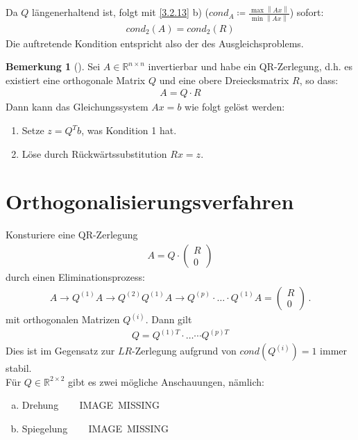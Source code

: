 \documentclass[ngerman,fontsize=11pt, paper=a4, parskip=half, titlepage=true, toc=bib]{scrbook}
\theoremstyle{definition}
\newtheorem{Bem}[Def]{Bemerkung}	%
\theoremstyle{plain}
\newcommand{\R}{\mathds{R}}
\newcommand{\Renn}{\mathds{R}^{n\times n}}
\newcommand{\nn}[1]{\left\| #1 \right\|}
\newcommand{\sectione}[1]{\section{#1} \setcounter{equation}{0}}
\newcommand{\subsectione}[1]{\subsection{#1} \addtocounter{Def}{1}}
\newenvironment{Beme}[1][]{ %
	\begin{Bem}[#1]
	}
	{
	\end{Bem}
	\addtocounter{subsection}{1}
}
\begin{document}
  Da $Q$ längenerhaltend ist, folgt mit \ref{3.2.13} b)
  ($cond_A \coloneqq \frac{\max \nn{Ax}}{\min \nn{Ax}}$)
  sofort:
  \begin{gather*}
    cond_2(A) = cond_2(R)
  \end{gather*}
  Die auftretende Kondition entspricht also der des Ausgleichsproblems.
  
  
\begin{Beme}
	Sei $A\in \Renn$ invertierbar und habe ein QR-Zerlegung, d.h. es existiert
	eine orthogonale Matrix $Q$ und eine obere Dreiecksmatrix $R$, so dass:
	\begin{gather*}
	A= Q\cdot R
	\end{gather*}
	Dann kann das Gleichungssystem $Ax=b$ wie folgt gelöst werden:
	\begin{enumerate}[1.]
		\item Setze $z=Q^Tb$, was Kondition 1 hat.
		\item Löse durch Rückwärtssubstitution $Rx=z$.
	\end{enumerate}
\end{Beme}
  


  \sectione{Orthogonalisierungsverfahren}		
  Konsturiere eine QR-Zerlegung
  \begin{gather}
    A= Q\cdot \begin{pmatrix} R\\0 \end{pmatrix}
    \label{IV.4.1}
  \end{gather}
  durch einen Eliminationsprozess:
  \begin{gather}
    A \rightarrow Q^{(1)}A \rightarrow Q^{(2)} Q^{(1)}A \rightarrow Q^{(p)}\cdot \dotsc \cdot Q^{(1)}A
    = \begin{pmatrix} R\\0 \end{pmatrix}\, .
    \label{IV.4.2}
  \end{gather}
  mit orthogonalen Matrizen $Q^{(i)}$.
  Dann gilt
  \begin{gather}
    Q= Q^{(1)T}\cdot \dotsc \cdots {Q^{(p)T}}
    \label{IV.4.3}
  \end{gather}
  Dies ist im Gegensatz zur $LR$-Zerlegung aufgrund von $cond(Q^{(i)})= 1$ immer stabil.\\
  
  Für $Q\in\R^{2\times 2}$ gibt es zwei mögliche Anschauungen, nämlich:
  \begin{enumerate}[a)]
  \item Drehung ~~~ IMAGE~MISSING
  \item Spiegelung ~~~ IMAGE~MISSING
  \end{enumerate}
  
\end{document}
